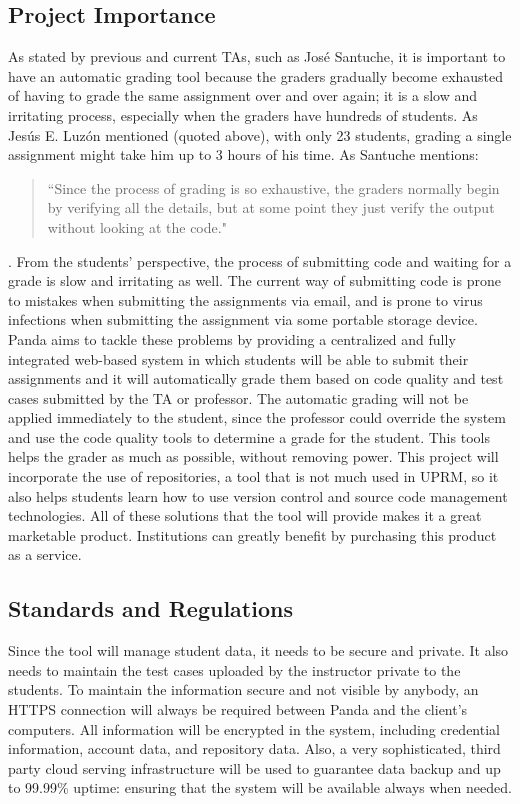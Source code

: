 \subsection{Project Importance}

As stated by previous and current TAs, such as José Santuche, it is important to
have an automatic grading tool because the graders gradually become exhausted of
having to grade the same assignment over and over again; it is a slow and
irritating process, especially when the graders have hundreds of students. As
Jesús E. Luzón mentioned (quoted above), with only 23 students, grading a single
assignment might take him up to 3 hours of his time. As Santuche mentions:
\begin{quote} ``Since the process of grading is so exhaustive, the graders
normally begin by verifying all the details, but at some point they just verify
the output without looking at the code." \end{quote}. From the students'
perspective, the process of submitting code and waiting for a grade is slow and
irritating as well. The current way of submitting code is prone to mistakes when
submitting the assignments via email, and is prone to virus infections when
submitting the assignment via some portable storage device. Panda aims to tackle
these problems by providing a centralized and fully integrated web-based system
in which students will be able to submit their assignments and it will
automatically grade them based on code quality and test cases submitted by the
TA or professor. The automatic grading will not be applied immediately to the
student, since the professor could override the system and use the code quality
tools to determine a grade for the student. This tools helps the grader as much
as possible, without removing power. This project will incorporate the use of
repositories, a tool that is not much used in UPRM, so it also helps students
learn how to use version control and source code management technologies. All of
these solutions that the tool will provide makes it a great marketable product.
Institutions can greatly benefit by purchasing this product as a service.

\subsection{Standards and Regulations}

Since the tool will manage student data, it needs to be secure and private. It
also needs to maintain the test cases uploaded by the instructor private to the
students. To maintain the information secure and not visible by anybody, an
HTTPS connection will always be required between Panda and the client's
computers. All information will be encrypted in the system, including credential
information, account data, and repository data. Also, a very sophisticated,
third party cloud serving infrastructure will be used to guarantee data backup
and up to 99.99\% uptime: ensuring that the system will be available always when
needed.
